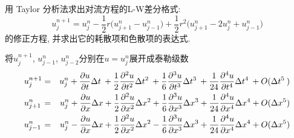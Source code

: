 \begin{problem}[问题8]
用 Taylor 分析法求出对流方程的L-W差分格式:
\[
u_j^{n+1} = u_j^n - \frac{1}{2}r\big(u_{j+1}^n - u_{j-1}^n\big) +\frac{1}{2}r^2
\big(u_{j+1}^n - 2u_j^n + u_{j-1}^n\big)
\]
的修正方程, 并求出它的耗散项和色散项的表达式.
\end{problem}

\vspace{1em}
\noindent 将$u_{j}^{n+1}$, $u_{j-1}^{n}$, $u_{j-2}^{n}$分别在$u=u_{j}^{n}$展开成泰勒级数
{\setlength\arraycolsep{2pt}
\begin{eqnarray*}
u_{j}^{n+1} & = & u_{j}^{n}+\frac{\partial u}{\partial t}\Delta t\:+\frac{1}{2}\frac{\partial^{2}u}{\partial t^{2}}\Delta t^{2}\:+\frac{1}{6}\frac{\partial^{3}u}{\partial t^{3}}\Delta t^{3}\:+\frac{1}{24}\frac{\partial^{4}u}{\partial t^{4}}\Delta t^{4}\:+O(\Delta t^{5}\:)\\
u_{j+1}^{n\hphantom{+1}} & = & u_{j}^{n}+\frac{\partial u}{\partial x}\Delta x+\frac{1}{2}\frac{\partial^{2}u}{\partial x^{2}}\Delta x^{2}+\frac{1}{6}\frac{\partial^{3}u}{\partial x^{3}}\Delta x^{3}+\frac{1}{24}\frac{\partial^{4}u}{\partial x^{4}}\Delta x^{4}+O(\Delta x^{5})\\
u_{j-1}^{n\hphantom{+1}} & = & u_{j}^{n}-\frac{\partial u}{\partial x}\Delta x+\frac{1}{2}\frac{\partial^{2}u}{\partial x^{2}}\Delta x{}^{2}-\frac{1}{6}\frac{\partial^{3}u}{\partial x^{3}}\Delta x{}^{3}+\frac{1}{24}\frac{\partial^{4}u}{\partial x^{4}}\Delta x^{4}+O(\Delta x^{5})
\end{eqnarray*}}


